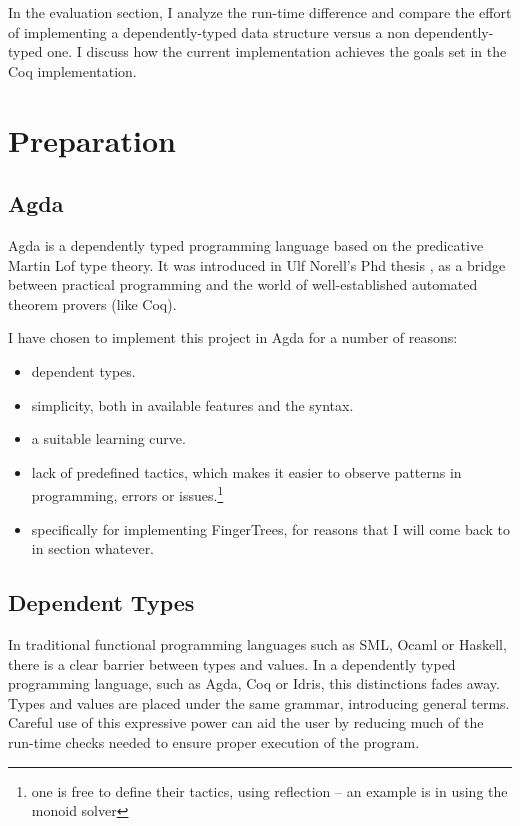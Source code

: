 \documentclass[12pt,twoside,notitlepage]{report}
\begin{document}
In the evaluation section, I analyze the run-time difference and compare the effort of implementing a dependently-typed data structure versus a non dependently-typed one. I discuss how the current implementation achieves the goals set in the Coq implementation.
 
\chapter{Preparation}

\section{Agda}

Agda\cite{agdatutorial} is a dependently typed programming language based on the predicative Martin Lof type theory. It was introduced in Ulf Norell’s Phd thesis \cite{agdaphd}, as a bridge between practical programming and the world of well-established automated theorem provers (like Coq). 

I have chosen to implement this project in Agda for a number of reasons: 
\begin{itemize}

\item dependent types.
\item simplicity, both in available features and the syntax.
\item a suitable learning curve.
\item lack of predefined tactics, which makes it easier to observe patterns in programming, errors or issues.\footnote{one is free to define their tactics, using reflection  – an example is in using the monoid solver}
\item specifically for implementing FingerTrees, for reasons that I will come back to in section whatever.
\end{itemize}

\section{Dependent Types} 

In traditional functional programming languages such as SML, Ocaml or Haskell, there is a clear barrier between types and values. In a dependently typed programming language, such as Agda, Coq or Idris, this distinctions fades away. Types and values are placed under the same grammar, introducing general terms. 
Careful use of this expressive power can aid the user by reducing much of the run-time checks needed to ensure proper execution of the program. 
\end{document}
